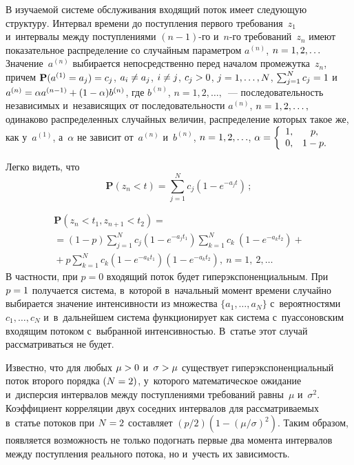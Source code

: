 \begin{multicols}{2}
В изучаемой системе обслуживания входящий поток имеет следующую структуру. 
Интервал времени до поступления первого требования~$z_1$ и~интервалы между 
поступлениями $(n-1)$-го и~$n$-го требований~$z_n$ имеют показательное распределение
со случайным параметром $a^{(n)}$, $n\hm=1, 2,\ldots$ Значение~$a^{(n)}$ выбирается 
непосредственно перед началом промежутка~$z_n$, причем $\mathbf{P}(a^{(1)}\hm=
a_j)=c_j$, $a_i\hm\ne a_j$, $i\hm\ne j$, $c_j\hm>0$, $j\hm=1,\ldots,N$, 
$\sum\nolimits_{j=1}^N c_j\hm=1$ и~$a^{(n)}\hm=\alpha a^{(n-1)}+(1-\alpha)b^{(n)}$, 
где $b^{(n)}$, $n=1,2,\ldots,$~--- последовательность независимых и~независящих 
от последовательности $a^{(n)}$, $n\hm=1,2,\ldots,$ одинаково 
распределенных случайных величин, распределение которых такое же, как у~$a^{(1)}$, 
а~$\alpha$ не зависит от~$a^{(n)}$ и~$b^{(n)}$, $n\hm=1,2,\ldots$, $\alpha\hm=\left\{
\begin{array}{cc}
1,&p,\\0,&1-p.
\end{array}
\right.
$

Легко видеть, что
$$
\mathbf{P}(z_n<t)= \sum\limits_{j=1}^Nc_j \left(1-e^{-a_jt}\right)\,;
$$

\vspace*{-12pt}

\noindent
\begin{multline*}
\mathbf{P}(z_n<t_1,z_{n+1}<t_2)={}\\
{}=(1-p)
\sum\limits_{j=1}^Nc_j\left(1-e^{-a_jt_1}\right)\sum\limits_{k=1}^Nc_k\:\left(1-e^{-a_kt_2}\right)+{}
\\
{}+p\sum\limits_{k=1}^Nc_k\left(1-e^{-a_kt_1}\right)\left(1-e^{-a_kt_2}\right),\ n=1,\:2,\ldots
\end{multline*}
В частности, при $p=0$ входящий поток будет гиперэкспоненциальным. При $p\hm=1$ 
получается система, в~которой в~начальный
момент времени случайно выбирается значение интенсивности из множества 
$\{a_1,\ldots,a_N\}$ с~вероятностями $c_1,\ldots,c_N$ и~в~дальнейшем система 
функционирует как система с~пуассоновским входящим потоком с~выбранной интенсивностью. 
В~статье этот случай рассматриваться не будет.

Известно, что для любых $\mu\hm>0$ и~$\sigma\hm>\mu$ существует гиперэкспоненциальный 
поток второго порядка $(N\hm=2)$, у~которого математическое ожидание и~дисперсия 
интервалов между поступлениями требований равны~$\mu$ и~$\sigma^2$. Коэффициент
корреляции двух соседних интервалов для рас\-смат\-ри\-ва\-емых в~статье потоков при $N\hm=2$ 
со\-став\-ля\-ет $({p}/{2})\left(1-\left({\mu}/{\sigma}\right)^2\right)$. Таким образом, 
появляется возможность не только подогнать первые два момента интервалов между 
поступления реального потока, но и~учесть их зависимость.


\end{multicols}
